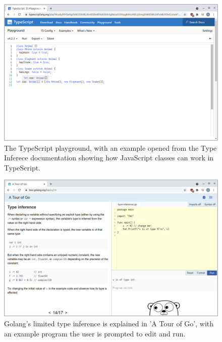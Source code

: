 \documentclass[a4paper,fleqn,oneside,12pt]{report}
\begin{document}
\begin{figure}[h!]
  \centering
  \includegraphics[width=1.000\linewidth]{images/image8.png}
  \caption{The TypeScript playground, with an example opened from the Type Inferece documentation showing how JavaScript classes can work in TypeScript.}
\end{figure}

\begin{figure}[h!]
  \centering
  \includegraphics[width=1.000\linewidth]{images/image5.png}
  \caption{Golang's limited type inference is explained in 'A Tour of Go', with an example program the user is prompted to edit and run.}
\end{figure}
\end{document}
